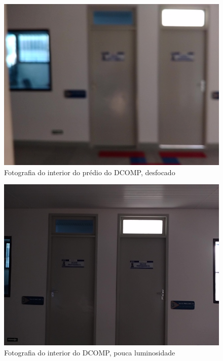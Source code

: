 \begin{figure}[H]
	\centering
		\includegraphics[width= \textwidth]{Imagens/figura4-17.jpg}
	\caption{Fotografia do interior do prédio do DCOMP, desfocado}
	\label{fig4:17}
\end{figure}

\begin{figure}[H]
	\centering
		\includegraphics[width= \textwidth]{Imagens/figura4-18.jpg}
	\caption{Fotografia do interior do DCOMP, pouca luminosidade}
	\label{fig4:18}
\end{figure}